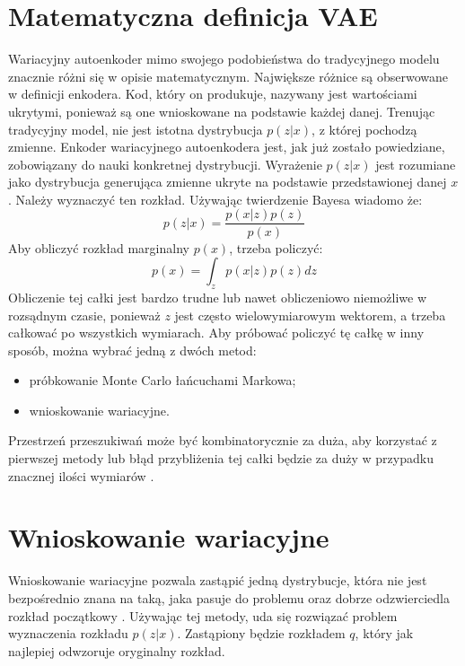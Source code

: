 \documentclass[a4paper,12pt,oneside]{book} %
\begin{document}
\section{Matematyczna definicja VAE}
Wariacyjny autoenkoder mimo swojego podobieństwa do tradycyjnego modelu znacznie różni się w opisie matematycznym. Największe różnice są obserwowane w definicji enkodera. Kod, który on produkuje, nazywany jest wartościami ukrytymi, ponieważ są one wnioskowane na podstawie każdej danej. Trenując tradycyjny model, nie jest istotna dystrybucja $p(z|x)$, z której pochodzą zmienne. Enkoder wariacyjnego autoenkodera jest, jak już zostało powiedziane, zobowiązany do nauki konkretnej dystrybucji. Wyrażenie $p(z|x)$ jest rozumiane jako dystrybucja generująca zmienne ukryte na podstawie przedstawionej danej $x$. Należy wyznaczyć ten rozkład. Używając twierdzenie Bayesa wiadomo że:
\begin{equation}
	p(z|x)=\dfrac{p(x|z)p(z)}{p(x)}
	\label{bayes}
\end{equation}
Aby obliczyć rozkład marginalny $p(x)$, trzeba policzyć:
\begin{equation}
	p(x) = \displaystyle\int_{z}^{}p(x|z)p(z)dz
	\label{pxcalka}
\end{equation}
Obliczenie tej całki jest bardzo trudne lub nawet obliczeniowo niemożliwe w rozsądnym czasie, ponieważ $z$ jest często wielowymiarowym wektorem, a trzeba całkować po wszystkich wymiarach. Aby próbować policzyć tę całkę w inny sposób, można wybrać jedną z dwóch metod:
\begin{itemize}
	\item próbkowanie Monte Carlo łańcuchami Markowa;
	\item wnioskowanie wariacyjne.
\end{itemize}
Przestrzeń przeszukiwań może być kombinatorycznie za duża, aby korzystać z pierwszej metody lub błąd przybliżenia tej całki będzie za duży w przypadku znacznej ilości wymiarów \cite{salimans2015markov}.

\section{Wnioskowanie wariacyjne}
Wnioskowanie wariacyjne pozwala zastąpić jedną dystrybucje, która nie jest bezpośrednio znana na taką, jaka pasuje do problemu oraz dobrze odzwierciedla rozkład początkowy \cite{variationalinference}. Używając tej metody, uda się rozwiązać problem wyznaczenia rozkładu $p(z|x)$. Zastąpiony będzie rozkładem $q$, który jak najlepiej odwzoruje oryginalny rozkład. 
\end{document}
